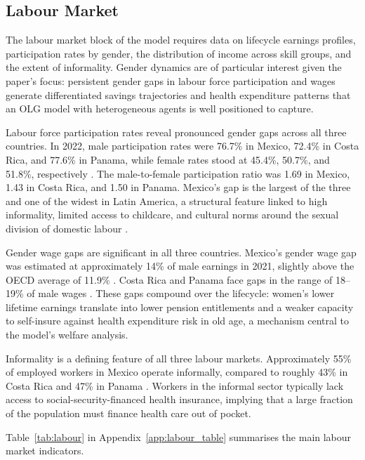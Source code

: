 \documentclass[12pt,a4paper]{article}
\begin{document}
\subsection{Labour Market}\label{subsec:labour}

The labour market block of the model requires data on lifecycle
earnings profiles, participation rates by gender, the distribution of
income across skill groups, and the extent of informality. Gender
dynamics are of particular interest given the paper's focus: persistent
gender gaps in labour force participation and wages generate
differentiated savings trajectories and health expenditure patterns
that an OLG model with heterogeneous agents is well positioned to
capture.

Labour force participation rates reveal pronounced gender gaps across
all three countries. In 2022, male participation rates were 76.7\% in
Mexico, 72.4\% in Costa Rica, and 77.6\% in Panama, while female rates
stood at 45.4\%, 50.7\%, and 51.8\%, respectively \citep{ECLACILO2023,
ILOILOSTAT2023}. The male-to-female participation ratio was 1.69 in
Mexico, 1.43 in Costa Rica, and 1.50 in Panama. Mexico's gap is the
largest of the three and one of the widest in Latin America, a
structural feature linked to high informality, limited access to
childcare, and cultural norms around the sexual division of domestic
labour \citep{IMF2023, ECLAC2023}.

Gender wage gaps are significant in all three countries. Mexico's
gender wage gap was estimated at approximately 14\% of male earnings in
2021, slightly above the OECD average of 11.9\% \citep{IMF2023}. Costa
Rica and Panama face gaps in the range of 18--19\% of male wages
\citep{ILOILOSTAT2023, WEFGGR2024}. These gaps compound over the
lifecycle: women's lower lifetime earnings translate into lower pension
entitlements and a weaker capacity to self-insure against health
expenditure risk in old age, a mechanism central to the model's welfare
analysis.

Informality is a defining feature of all three labour markets.
Approximately 55\% of employed workers in Mexico operate informally,
compared to roughly 43\% in Costa Rica and 47\% in Panama
\citep{ECLACILO2023}. Workers in the informal sector typically lack
access to social-security-financed health insurance, implying that a
large fraction of the population must finance health care out of
pocket. 

Table~\ref{tab:labour} in Appendix~\ref{app:labour_table} summarises the main labour market indicators.
\end{document}

